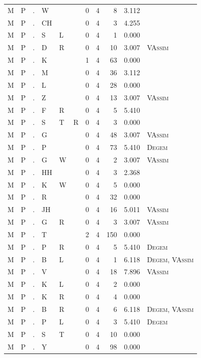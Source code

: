 \documentclass[12pt]{article}
\begin{document}
\begin{longtable}{r@{ } r@{ } c@{ } l@{ } l@{ } l@{ } r r r r l }
M & P & . & W &  &  & 0 & 4 & 8 & 3.112 &  \\
M & P & . & CH &  &  & 0 & 4 & 3 & 4.255 &  \\
M & P & . & S & L &  & 0 & 4 & 1 & 0.000 &  \\
M & P & . & D & R &  & 0 & 4 & 10 & 3.007 & \textsc{VAssim} \\
M & P & . & K &  &  & 1 & 4 & 63 & 0.000 &  \\
M & P & . & M &  &  & 0 & 4 & 36 & 3.112 &  \\
M & P & . & L &  &  & 0 & 4 & 28 & 0.000 &  \\
M & P & . & Z &  &  & 0 & 4 & 13 & 3.007 & \textsc{VAssim} \\
M & P & . & F & R &  & 0 & 4 & 5 & 5.410 &  \\
M & P & . & S & T & R & 0 & 4 & 3 & 0.000 &  \\
M & P & . & G &  &  & 0 & 4 & 48 & 3.007 & \textsc{VAssim} \\
M & P & . & P &  &  & 0 & 4 & 73 & 5.410 & \textsc{Degem} \\
M & P & . & G & W &  & 0 & 4 & 2 & 3.007 & \textsc{VAssim} \\
M & P & . & HH &  &  & 0 & 4 & 3 & 2.368 &  \\
M & P & . & K & W &  & 0 & 4 & 5 & 0.000 &  \\
M & P & . & R &  &  & 0 & 4 & 32 & 0.000 &  \\
M & P & . & JH &  &  & 0 & 4 & 16 & 5.011 & \textsc{VAssim} \\
M & P & . & G & R &  & 0 & 4 & 3 & 3.007 & \textsc{VAssim} \\
M & P & . & T &  &  & 2 & 4 & 150 & 0.000 &  \\
M & P & . & P & R &  & 0 & 4 & 5 & 5.410 & \textsc{Degem} \\
M & P & . & B & L &  & 0 & 4 & 1 & 6.118 & \textsc{Degem}, \textsc{VAssim} \\
M & P & . & V &  &  & 0 & 4 & 18 & 7.896 & \textsc{VAssim} \\
M & P & . & K & L &  & 0 & 4 & 2 & 0.000 &  \\
M & P & . & K & R &  & 0 & 4 & 4 & 0.000 &  \\
M & P & . & B & R &  & 0 & 4 & 6 & 6.118 & \textsc{Degem}, \textsc{VAssim} \\
M & P & . & P & L &  & 0 & 4 & 3 & 5.410 & \textsc{Degem} \\
M & P & . & S & T &  & 0 & 4 & 10 & 0.000 &  \\
M & P & . & Y &  &  & 0 & 4 & 98 & 0.000 &  \\

\end{longtable}
\end{document}
